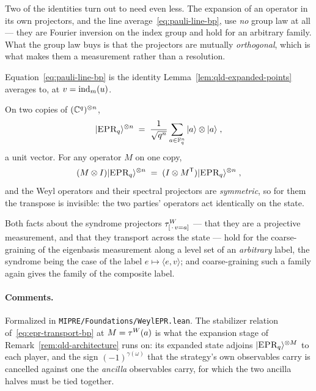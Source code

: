 Two of the identities turn out to need even less. The expansion of an operator in its own
projectors, and the line average~\eqref{eq:pauli-line-bp}, use \emph{no} group law at all --- they
are Fourier inversion on the index group and hold for an arbitrary family. What the group law buys
is that the projectors are mutually \emph{orthogonal}, which is what makes them a measurement
rather than a resolution.

Equation~\eqref{eq:pauli-line-bp} is the identity Lemma~\ref{lem:qld-expanded-points} averages
to, at $v = \mathrm{ind}_m(u)$.

\begin{definition}
\label{def:weyl-epr}
\leanok
On two copies of $(\mathbb{C}^q)^{\otimes n}$,
\begin{equation*}
  |\textsc{EPR}_q\rangle^{\otimes n} \;=\; \frac{1}{\sqrt{q^n}} \sum_{a \in \mathbb{F}_q^n} |a\rangle \otimes |a\rangle\;,
\end{equation*}
a unit vector. For any operator $M$ on one copy,
\begin{equation}
  \label{eq:epr-transport-bp}
  (M \otimes I) |\textsc{EPR}_q\rangle^{\otimes n} \;=\; (I \otimes M^{\mathsf T}) |\textsc{EPR}_q\rangle^{\otimes n}\;,
\end{equation}
and the Weyl operators and their spectral projectors are \emph{symmetric}, so for them the
transpose is invisible: the two parties' operators act identically on the state.

Both facts about the syndrome projectors $\tau^W_{[\,\cdot\, v = a]}$ --- that they are a projective
measurement, and that they transport across the state --- hold for the coarse-graining of the
eigenbasis measurement along a level set of an \emph{arbitrary} label, the syndrome being the case
of the label $e \mapsto \langle e, v\rangle$; and coarse-graining such a family again gives the
family of the composite label.
\end{definition}

\paragraph{Comments.} Formalized in \texttt{MIPRE/Foundations/WeylEPR.lean}. The stabilizer
relation of~\eqref{eq:epr-transport-bp} at $M = \tau^W(a)$ is what the expansion stage of
Remark~\ref{rem:qld-architecture} runs on: its expanded state adjoins $|\textsc{EPR}_q\rangle^{\otimes M}$ to
each player, and the sign $(-1)^{\gamma(\omega)}$ that the strategy's own observables carry is
cancelled against one the \emph{ancilla} observables carry, for which the two ancilla halves must
be tied together.

